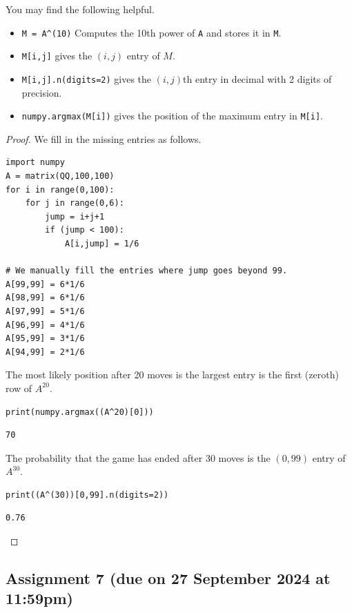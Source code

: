 \documentclass{amsart}
\begin{document}
\begin{enumerate}
You may find the following helpful.
\begin{itemize}
\item \texttt{M = A\textasciicircum{}(10)} Computes the 10th power of \texttt{A} and stores it in \texttt{M}.

\item \texttt{M[i,j]} gives the \((i,j)\) entry of \(M\).

\item \texttt{M[i,j].n(digits=2)} gives the \((i,j)\)th entry in decimal with 2 digits of precision.

\item \texttt{numpy.argmax(M[i])} gives the position of the maximum entry in \texttt{M[i]}.
\end{itemize}

\begin{proof}
We fill in the missing entries as follows.
\begin{verbatim}
import numpy
A = matrix(QQ,100,100)
for i in range(0,100):
    for j in range(0,6):
        jump = i+j+1
        if (jump < 100):
            A[i,jump] = 1/6

# We manually fill the entries where jump goes beyond 99.
A[99,99] = 6*1/6
A[98,99] = 6*1/6
A[97,99] = 5*1/6
A[96,99] = 4*1/6
A[95,99] = 3*1/6
A[94,99] = 2*1/6
\end{verbatim}

The most likely position after 20 moves is the largest entry is the first (zeroth) row of \(A^{20}\).
\begin{verbatim}
print(numpy.argmax((A^20)[0]))
\end{verbatim}

\label{orga9b413d}
\begin{verbatim}
70
\end{verbatim}


The probability that the game has ended after 30 moves is the \((0,99)\) entry of \(A^{30}\).
\begin{verbatim}
print((A^(30))[0,99].n(digits=2))
\end{verbatim}

\label{org4216200}
\begin{verbatim}
0.76
\end{verbatim}
\end{proof}
\end{enumerate}
\subsection{Assignment 7  (due on 27 September 2024 at 11:59pm)}
\label{sec:orgc6e4553}
\togglefalse{solutions}
\end{document}

